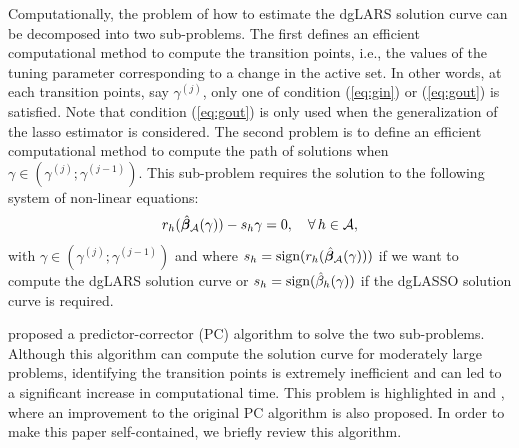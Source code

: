 Computationally, the problem of how to estimate the dgLARS solution curve can be decomposed into two sub-problems. The first defines an efficient computational method to compute the transition points, i.e., the values of the tuning parameter corresponding to a change in the active set. In other words, at each transition points, say $\gamma^{(j)}$, only one of condition (\ref{eq:gin}) or (\ref{eq:gout}) is satisfied. Note that condition (\ref{eq:gout}) is only used when the generalization of the lasso estimator is considered. The second problem is to define an efficient computational method to compute the path of solutions when $\gamma\in (\gamma^{(j)}; \gamma^{(j-1)})$. This sub-problem requires the solution to the following system of non-linear equations:
$$
r_h(\hat{\bm\beta}_{\mathcal{A}}(\gamma)) -  s_h \gamma= 0, \quad\forall\,h\in\mathcal{A},
$$
with $\gamma\in (\gamma^{(j)}; \gamma^{(j-1)})$ and where $s_h = \text{sign}(r_h(\hat{\bm\beta}_{\mathcal{A}}(\gamma)))$ if we want to compute the dgLARS solution curve or $s_h = \text{sign}(\hat\beta_h(\gamma))$ if the dgLASSO solution curve is required.

\cite{Augug13} proposed a predictor-corrector (PC) algorithm to solve the two sub-problems. Although this algorithm can compute the solution curve for moderately large problems, identifying the transition points is extremely inefficient and can led to a significant increase in computational time. This problem is highlighted in \cite{pazira} and \cite{pazira_3}, where an improvement to the original PC algorithm is also proposed. In order to make this paper self-contained, we briefly review this algorithm.

